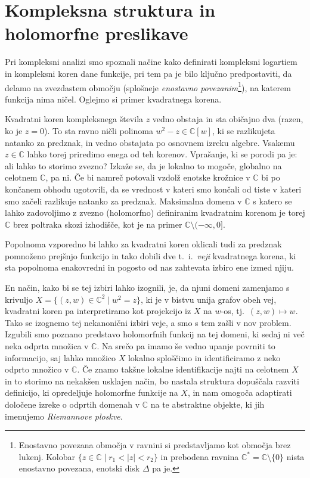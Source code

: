 \documentclass[mat1]{fmfdelo}
\numberwithin{equation}{section}
\newcommand{\C}{\mathbb C}
\newcommand{\CM}{\mathbb C ^*}
\newcommand{\abs}[1]{\left\lvert #1 \right\rvert}
\newcommand{\ti}{t.~i.\ }
\newcommand{\tj}{tj.\ }
\theoremstyle{definition}
\begin{document}
\section{Kompleksna struktura in holomorfne preslikave} \label{riemannove ploskve}
Pri kompleksni analizi smo spoznali načine kako definirati kompleksni logartiem in kompleksni koren dane funkcije, pri tem pa je bilo ključno predpostaviti, da delamo na zvezdastem območju (splošneje \emph{enostavno povezanim}\footnote{Enostavno povezana območja v ravnini si predstavljamo kot območja brez lukenj. Kolobar $\{z \in \C \mid r_1 < \abs{z} < r_2\}$ in prebodena ravnina $\CM = \C\setminus\{0\}$ nista enostavno povezana, enotski disk $\Delta$ pa je.}), na katerem funkcija nima ničel. Oglejmo si primer kvadratnega korena.

Kvadratni koren kompleksnega števila $z$ vedno obstaja in sta običajno dva (razen, ko je $z = 0$). To sta ravno ničli polinoma $w^2 - z \in \C[w]$, ki se razlikujeta natanko za predznak, in vedno obstajata po osnovnem izreku algebre. Vsakemu $z \in \C$ lahko torej priredimo enega od teh korenov. Vprašanje, ki se porodi pa je: ali lahko to storimo zvezno? Izkaže se, da je lokalno to mogoče, globalno na celotnem $\C$, pa ni. Če bi namreč potovali vzdolž enotske krožnice v $\C$ bi po končanem obhodu ugotovili, da se vrednost v kateri smo končali od tiste v kateri smo začeli razlikuje natanko za predznak. Maksimalna domena v $\C$ s katero se lahko zadovoljimo z zvezno (holomorfno) definiranim kvadratnim korenom je torej $\C$ brez poltraka skozi izhodišče, kot je na primer $\C \setminus (-\infty, 0]$.

Popolnoma vzporedno bi lahko za kvadratni koren oklicali tudi za predznak pomnoženo prejšnjo funkcijo in tako dobili dve \ti \emph{veji} kvadratnega korena, ki sta popolnoma enakovredni in pogosto od nas zahtevata izbiro ene izmed njiju. 

En način, kako bi se tej izbiri lahko izognili, je, da njuni domeni zamenjamo s krivuljo $X = \{(z,w) \in \C^2 \mid w^2 = z\}$, ki je v bistvu unija grafov obeh vej, kvadratni koren pa interpretiramo kot projekcijo iz $X$ na $w$-os, \tj $(z,w) \mapsto w$. Tako se izognemo tej nekanonični izbiri veje, a smo s tem zašli v nov problem. Izgubili smo poznano predstavo holomorfnih funkcij na tej domeni, ki sedaj ni več neka odprta množica v $\C$. Na srečo pa imamo še vedno upanje povrniti to informacijo, saj lahko množico $X$ lokalno sploščimo in identificiramo z neko odprto množico v $\C$. Če znamo takšne lokalne identifikacije najti na celotnem $X$ in to storimo na nekakšen usklajen način, bo nastala struktura dopuščala razviti definicijo, ki opredeljuje holomorfne funkcije na $X$, in nam omogoča adaptirati določene izreke o odprtih domenah v $\C$ na te abstraktne objekte, ki jih imenujemo \emph{Riemannove ploskve}.  
\end{document}
